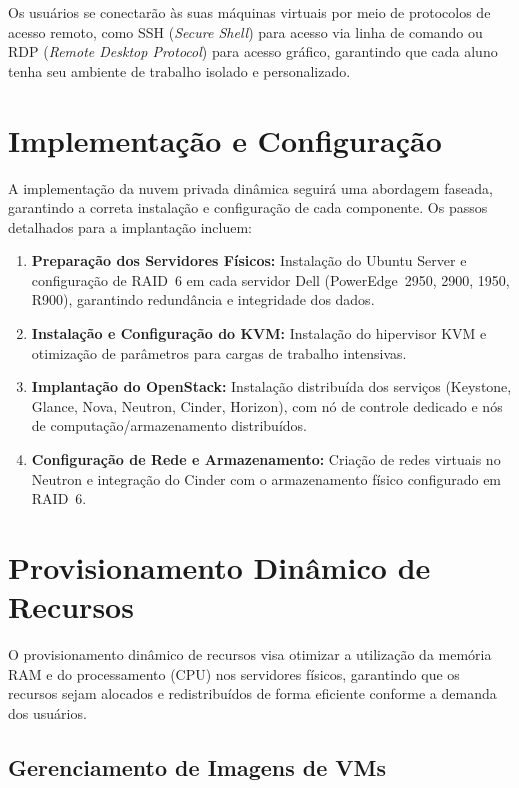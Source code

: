 Os usuários se conectarão às suas máquinas virtuais por meio de protocolos de acesso remoto, como SSH (\textit{Secure Shell}) para acesso via linha de comando ou RDP (\textit{Remote Desktop Protocol}) para acesso gráfico, garantindo que cada aluno tenha seu ambiente de trabalho isolado e personalizado.


\section{Implementação e Configuração}

A implementação da nuvem privada dinâmica seguirá uma abordagem faseada, garantindo a correta instalação e configuração de cada componente. Os passos detalhados para a implantação incluem:

\begin{enumerate}
 \item \textbf{Preparação dos Servidores Físicos:} Instalação do Ubuntu Server e configuração de RAID~6 em cada servidor Dell (PowerEdge~2950, 2900, 1950, R900), garantindo redundância e integridade dos dados.
 \item \textbf{Instalação e Configuração do KVM:} Instalação do hipervisor KVM e otimização de parâmetros para cargas de trabalho intensivas.
 \item \textbf{Implantação do OpenStack:} Instalação distribuída dos serviços (Keystone, Glance, Nova, Neutron, Cinder, Horizon), com nó de controle dedicado e nós de computação/armazenamento distribuídos.
 \item \textbf{Configuração de Rede e Armazenamento:} Criação de redes virtuais no Neutron e integração do Cinder com o armazenamento físico configurado em RAID~6.
\end{enumerate}


\section{Provisionamento Dinâmico de Recursos}

O provisionamento dinâmico de recursos visa otimizar a utilização da memória RAM e do processamento (CPU) nos servidores físicos, garantindo que os recursos sejam alocados e redistribuídos de forma eficiente conforme a demanda dos usuários.

\subsection{Gerenciamento de Imagens de VMs}

